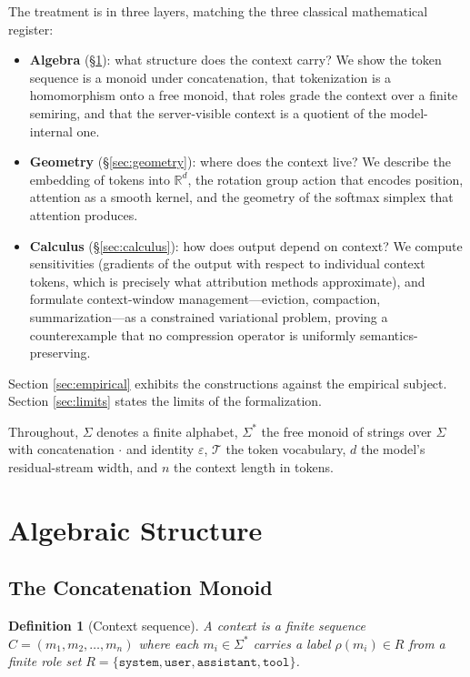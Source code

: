 \documentclass[11pt]{article}
\newtheorem{definition}[theorem]{Definition}
\begin{document}
The treatment is in three layers, matching the three classical mathematical
register:

\begin{itemize}
\item \textbf{Algebra} (\S\ref{sec:algebra}): what structure does the context
carry? We show the token sequence is a monoid under concatenation, that
tokenization is a homomorphism onto a free monoid, that roles grade the
context over a finite semiring, and that the server-visible context is a
quotient of the model-internal one.
\item \textbf{Geometry} (\S\ref{sec:geometry}): where does the context live?
We describe the embedding of tokens into $\mathbb{R}^d$, the rotation group
action that encodes position, attention as a smooth kernel, and the geometry
of the softmax simplex that attention produces.
\item \textbf{Calculus} (\S\ref{sec:calculus}): how does output depend on
context? We compute sensitivities (gradients of the output with respect to
individual context tokens, which is precisely what attribution methods
approximate), and formulate context-window management---eviction, compaction,
summarization---as a constrained variational problem, proving a
counterexample that no compression operator is uniformly
semantics-preserving.
\end{itemize}

Section \ref{sec:empirical} exhibits the constructions against the empirical
subject. Section \ref{sec:limits} states the limits of the formalization.

Throughout, $\Sigma$ denotes a finite alphabet, $\Sigma^*$ the free monoid of
strings over $\Sigma$ with concatenation $\cdot$ and identity $\varepsilon$,
$\mathcal{T}$ the token vocabulary, $d$ the model's residual-stream width, and
$n$ the context length in tokens.

\section{Algebraic Structure}\label{sec:algebra}

\subsection{The Concatenation Monoid}

\begin{definition}[Context sequence]
A \emph{context} is a finite sequence
$C = (m_1, m_2, \dots, m_n)$ where each $m_i \in \Sigma^*$ carries a label
$\rho(m_i) \in R$ from a finite role set
$R = \{\texttt{system}, \texttt{user}, \texttt{assistant},
\texttt{tool}\}$.
\end{definition}
\end{document}
